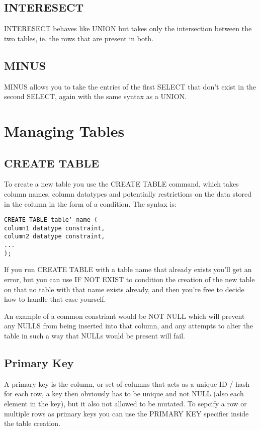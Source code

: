 \documentclass[10pt, english]{article}
\begin{document}
\subsection{INTERESECT}
INTERESECT behaves like UNION but takes only the intersection between the two tables, ie. the rows that are present in both.

\subsection{MINUS}
MINUS allows you to take the entries of the first SELECT that don't exist in the second SELECT, again with the same syntax as a UNION.

\newpage
\section{Managing Tables}
\subsection{CREATE TABLE}
To create a new table you use the CREATE TABLE command, which takes column names, column datatypes and potentially restrictions on the data stored in the column in the
form of a condition. The syntax is:

\texttt{CREATE TABLE table\char`_name ( \\
\hspace*{10pt} column1 datatype constraint, \\
\hspace*{10pt} column2 datatype constraint, \\
\hspace*{10pt} ... \\
);}

If you run CREATE TABLE with a table name that already exists you'll get an error, but you can use IF NOT EXIST to
condition the creation of the new table on that no table with that name exists already, and then you're free to decide 
how to handle that case yourself.

An example of a common constriant would be NOT NULL which will prevent any NULLS from being inserted into that column,
and any attempts to alter the table in such a way that NULLs would be present will fail.

\subsection{Primary Key}
A primary key is the column, or set of columns that acts as a unique ID / hash for each row, a key then
obviously has to be unique and not NULL (also each element in the key), but it also not allowed to be mutated. To sepcify a row or multiple rows as primary keys you can use the PRIMARY KEY specifier inside the table creation.
\end{document}
